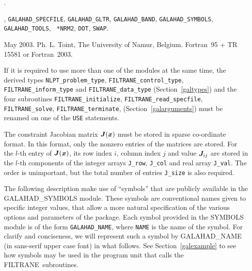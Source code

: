 \documentclass{galahad}
\newcommand{\packagename}{FILTRANE}
\newcommand{\fullpackagename}{\libraryname\_\packagename}
\newcommand{\sym}{\sf\small}
\begin{document}

\galattributes
\galversions{\tt  \fullpackagename\_single, \fullpackagename\_double}.

, {\tt GALAHAD\_SPECFILE}, {\tt GALAHAD\_GLTR},
{\tt GALAHAD\_BAND}, {\tt GALAHAD\_SYMBOLS}, {\tt GALAHAD\_TOOLS}, {\tt
*NRM2}, {\tt *DOT}, {\tt *SWAP}.

\galdate May 2003.
\galorigin Ph. L. Toint, The University of Namur, Belgium.
\gallanguage Fortran~95 + TR 15581 or Fortran~2003. 


\galhowto



\noindent
If it is required to use more than one of the modules at the same time, 
the derived types
{\tt NLPT\_problem\_type}, 
{\tt \packagename\_control\_type}, 
{\tt \packagename\_inform\_type} 
and
{\tt \packagename\_data\_type}
(Section~\ref{galtypes})
and the four subroutines
{\tt \packagename\_initialize}, 
{\tt \packagename\_read\_specfile}, 
{\tt \packagename\_solve}, 
{\tt \packagename\_terminate}, 
(Section~\ref{galarguments})
must be renamed on one of the {\tt USE} statements.


\galmatrix

The constraint Jacobian matrix ${\bm{J}}({\bm{x}})$ must be stored in sparse
co-ordinate format.  In this format, only the nonzero entries of the matrices
are stored. For the $l$-th entry of ${\bm{J}}({\bm{x}})$, its row index $i$, column
index $j$ and value ${\bm{J}}_{ij}$ are stored in the $l$-th components of the
integer arrays {\tt J\_row}, {\tt J\_col} and real array {\tt J\_val}.  The
order is unimportant, but the total number of entries {\tt J\_size} is also
required.





\galsymbols

The following description make use of ``symbols'' that are publicly available
in the GALAHAD\_SYMBOLS module. These symbols are conventional names given to
specific integer values, that allow a more natural specification of the
various options and parameters of the package.  Each symbol provided in the
SYMBOLS module is of the form {\tt GALAHAD\_NAME}, where {\tt NAME} is the name
of the symbol.  For clarify and conciseness, we will represent such a symbol
by {\sym GALAHAD\_NAME} (in sans-serif upper case font) in what follows. See
Section~\ref{galexample} to see how symbols may be used in the program unit
that calls the \packagename\ subroutines.
\end{document}
